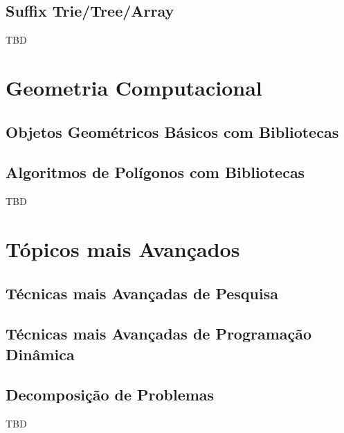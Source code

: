 \documentclass[11pt]{scrartcl}
\begin{document}
\subsection{Suffix Trie/Tree/Array}

TBD


\section{Geometria Computacional}

\subsection{Objetos Geométricos Básicos com Bibliotecas}

\subsection{Algoritmos de Polígonos com Bibliotecas}

TBD


\section{Tópicos mais Avançados}

\subsection{Técnicas mais Avançadas de Pesquisa}

\subsection{Técnicas mais Avançadas de Programação Dinâmica}

\subsection{Decomposição de Problemas}

TBD
\end{document}
